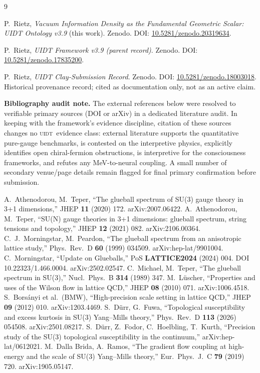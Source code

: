 \documentclass[12pt,a4paper,twoside]{article}
\theoremstyle{plain}
\theoremstyle{definition}
\theoremstyle{remark}
\newcommand{\UIDT}{\textsc{uidt}}
\begin{document}
\newpage

\begin{thebibliography}{9}
\footnotesize

P.~Rietz, \textit{Vacuum Information Density as the Fundamental Geometric Scalar: UIDT Ontology v3.9} (this work). Zenodo. DOI: \href{https://doi.org/10.5281/zenodo.20319634}{10.5281/zenodo.20319634}.

P.~Rietz, \textit{UIDT Framework v3.9 (parent record)}. Zenodo. DOI: \href{https://doi.org/10.5281/zenodo.17835200}{10.5281/zenodo.17835200}.

P.~Rietz, \textit{UIDT Clay-Submission Record}. Zenodo. DOI: \href{https://doi.org/10.5281/zenodo.18003018}{10.5281/zenodo.18003018}. Historical provenance record; cited as documentation only, not as an active claim.

\textbf{Bibliography audit note.} The external references below were resolved to verifiable primary sources (DOI or arXiv) in a dedicated literature audit. In keeping with the framework's evidence discipline, citation of these sources changes no \UIDT\ evidence class: external literature supports the quantitative pure-gauge benchmarks, is contested on the interpretive physics, explicitly identifies open chiral-fermion obstructions, is interpretive for the consciousness frameworks, and refutes any MeV-to-neural coupling. A small number of secondary venue/page details remain flagged for final primary confirmation before submission.

A.~Athenodorou, M.~Teper, ``The glueball spectrum of SU(3) gauge theory in 3+1 dimensions,'' JHEP \textbf{11} (2020) 172. arXiv:2007.06422.
A.~Athenodorou, M.~Teper, ``SU(N) gauge theories in 3+1 dimensions: glueball spectrum, string tensions and topology,'' JHEP \textbf{12} (2021) 082. arXiv:2106.00364.
C.~J.~Morningstar, M.~Peardon, ``The glueball spectrum from an anisotropic lattice study,'' Phys.\ Rev.\ D \textbf{60} (1999) 034509. arXiv:hep-lat/9901004.
C.~Morningstar, ``Update on Glueballs,'' PoS \textbf{LATTICE2024} (2024) 004. DOI 10.22323/1.466.0004. arXiv:2502.02547.
C.~Michael, M.~Teper, ``The glueball spectrum in SU(3),'' Nucl.\ Phys.\ B \textbf{314} (1989) 347.
M.~L\"uscher, ``Properties and uses of the Wilson flow in lattice QCD,'' JHEP \textbf{08} (2010) 071. arXiv:1006.4518.
S.~Bors\'anyi et al.\ (BMW), ``High-precision scale setting in lattice QCD,'' JHEP \textbf{09} (2012) 010. arXiv:1203.4469.
S.~D\"urr, G.~Fuwa, ``Topological susceptibility and excess kurtosis in SU(3) Yang--Mills theory,'' Phys.\ Rev.\ D \textbf{113} (2026) 054508. arXiv:2501.08217.
S.~D\"urr, Z.~Fodor, C.~Hoelbling, T.~Kurth, ``Precision study of the SU(3) topological susceptibility in the continuum,'' arXiv:hep-lat/0612021.
M.~Dalla Brida, A.~Ramos, ``The gradient flow coupling at high-energy and the scale of SU(3) Yang--Mills theory,'' Eur.\ Phys.\ J.\ C \textbf{79} (2019) 720. arXiv:1905.05147.


\end{thebibliography}
\end{document}
